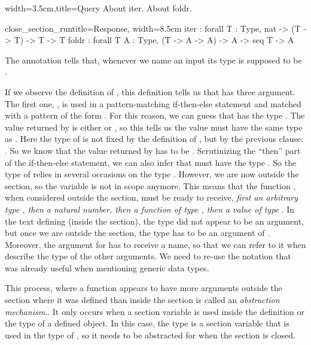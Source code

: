 \begin{coq}{}{width=3.5cm,title=Query}
About iter.
About foldr.
$~$
\end{coq}
\begin{coqout}{close_section_run}{title=Response, width=8.5cm}
iter : forall T : Type, nat -> (T -> T) -> T -> T
foldr :
  forall T A : Type, (T -> A -> A) -> A -> seq T -> A
\end{coqout}
The  annotation tells \Coq{} that, whenever we name
an input  its type is supposed to be .

If we observe the definition of , this definition tells us
that  has three argument.  The first one, , is used in
a pattern-matching if-then-else statement and matched with a pattern of the
form .  For this reason, we can guess that  has the type .
The value returned by  is either  or , so this
tells us the value must have the same type as .  Here the type of
 is not fixed by the definition of , but by the previous clause:
.  So we know that the value returned by 
has to be .  Scrutinizing the ``then'' part of the if-then-else statement,
we can also infer that  must have the type .  So the type
of  relies in several occasions on the type .  However, we are
now outside the section, so the variable  is not in
scope anymore.  This means that the function , when considered
outside the section, must be ready to receive, {\em first an arbitrary type
 , then a natural number, then a function of type , then a
value of type }.  In the text defining  (inside the section), the
type  did not appear to be an argument, but once we are outside
the section, the type  has to be an argument of .  Moreover,
the argument for  has to receive a name, so that we can refer to it when
describe the type of the other arguments.  We need to re-use the 
notation that was already useful when mentioning generic data types.

This process, where a function appears to have more arguments outside
the section where it was defined than inside the section is called
an {\em abstraction mechanism}..
It only occurs when a section variable is used inside the definition or
the type of a defined object.  In this case, the type  is a section
variable that is used in the type of , so it needs to be
abstracted for  when the section is closed.

